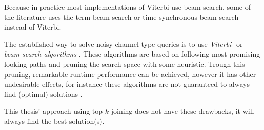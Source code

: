 \begin{draft}
\begin{displayquote}
Because in practice most implementations of Viterbi use beam
search, some of the literature uses the term beam search or time-synchronous beam
search instead of Viterbi.
\end{displayquote}
\end{draft}

The established way to solve noisy channel type queries is to use
\emph{Viterbi-} or \emph{beam-search-algorithms}
\parencite{JurafskyMartin2009,Bickel2005}.
These algorithms are based on following most promising looking paths and
pruning the search space with some heuristic.
Trough this pruning, remarkable runtime performance can be achieved, however it
has other undesirable effects, for instance these algorithms are not guaranteed
to always find (optimal) solutions \parencite{Bickel2005}.

This thesis' approach using top-$k$ joining does not have these drawbacks, it
will always find the best solution(s).
